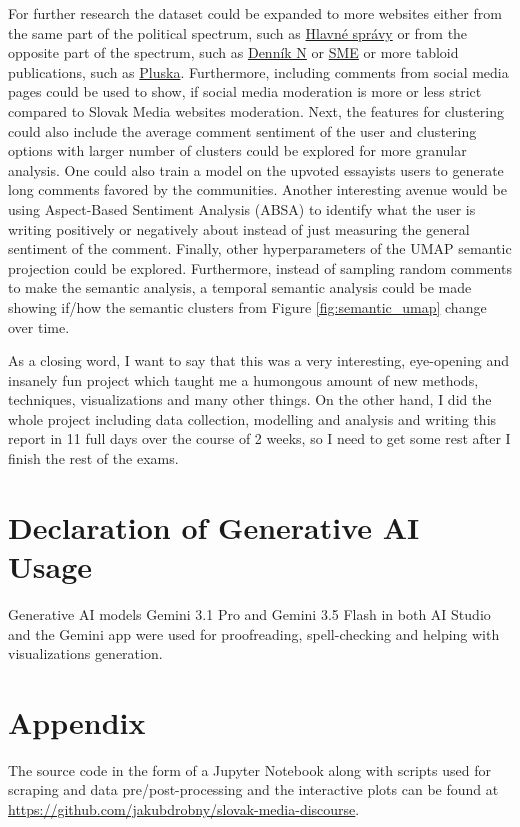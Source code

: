 \documentclass[11pt,a4paper]{article}
\begin{document}
For further research the dataset could be expanded to more websites either from the same part of the political spectrum, such as \href{https://www.hlavnespravy.sk/}{Hlavné správy} or from the opposite part of the spectrum, such as \href{https://www.dennikn.sk/}{Denník N} or \href{https://www.sme.sk/}{SME} or more tabloid publications, such as \href{https://www1.pluska.sk/}{Pluska}. Furthermore, including comments from social media pages could be used to show, if social media moderation is more or less strict compared to Slovak Media websites moderation. Next, the features for clustering could also include the average comment sentiment of the user and clustering options with larger number of clusters could be explored for more granular analysis. One could also train a model on the upvoted essayists users to generate long comments favored by the communities. Another interesting avenue would be using Aspect-Based Sentiment Analysis (ABSA) \cite{Hua2024} to identify what the user is writing positively or negatively about instead of just measuring the general sentiment of the comment. Finally, other hyperparameters of the UMAP semantic projection could be explored. Furthermore, instead of sampling random comments to make the semantic analysis, a temporal semantic analysis could be made showing if/how the semantic clusters from Figure \ref{fig:semantic_umap} change over time.

As a closing word, I want to say that this was a very interesting, eye-opening and insanely fun project which taught me a humongous amount of new methods, techniques, visualizations and many other things. On the other hand, I did the whole project including data collection, modelling and analysis and writing this report in 11 full days over the course of 2 weeks, so I need to get some rest after I finish the rest of the exams.

\section*{Declaration of Generative AI Usage}
Generative AI models Gemini 3.1 Pro and Gemini 3.5 Flash in both AI Studio and the Gemini app were used for proofreading, spell-checking and helping with visualizations generation.

\section*{Appendix}
The source code in the form of a Jupyter Notebook along with scripts used for scraping and data pre/post-processing and the interactive plots can be found at \href{https://github.com/jakubdrobny/slovak-media-discourse}{https://github.com/jakubdrobny/slovak-media-discourse}.



\end{document}
